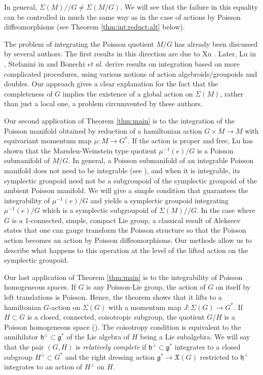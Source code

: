 \documentclass[a4paper,11pt]{amsart}
\theoremstyle{definition}
\theoremstyle{remark}
\begin{document}
In general, $\Sigma(M)//G\not=\Sigma(M/G)$. We will see that the failure
in this equality can be controlled in much the same way as in the
case of actions by Poisson diffeomorphisms \cite{FerOrRa} (see
Theorem \ref{thm:int:reduct:alt} below).

The problem of integrating the Poisson quotient $M/G$ has already been discussed by several authors. The first
results in this direction are due to Xu \cite{Xu1}. Later, Lu in \cite{Lu3}, Stefanini in \cite{Ste} and Bonechi
\textit{et al.} \cite{BCST} derive results on integration based on more complicated procedures, using various
notions of action algebroids/groupoids and doubles. Our approach gives a clear explanation for the fact that the
completeness of $G$ implies the existence of a global action on $\Sigma(M)$, rather than just a local one, a
problem circumvented by these authors.

Our second application of Theorem \ref{thm:main} is to the integration of the Poisson manifold obtained by
reduction of a hamiltonian action $G\times M\to M$ with equivariant momentum map $\mu:M\to G^*$. If the action
is proper and free, Lu \cite{Lu1} has shown that the Marsden-Weinstein type quotient $\mu^{-1}(e)/G$ is a
Poisson submanifold of $M/G$. In general, a Poisson submanifold of an integrable Poisson manifold does not need
to be integrable (see \cite{CrFe2}), and when it is integrable, its symplectic groupoid need not be a
subgroupoid of the symplectic groupoid of the ambient Poisson manifold. We will give a simple condition that
guarantees the integrability of $\mu^{-1}(e)/G$ and yields a symplectic groupoid integrating $\mu^{-1}(e)/G$
which is a symplectic subgroupoid of $\Sigma(M)//G$. In the case where $G$ is a 1-connected, simple, compact Lie
group, a classical result of Alekseev \cite{Alek} states that one can gauge transform the Poisson structure so
that the Poisson action becomes an action by Poisson diffeomorphisms. Our methods allow us to describe what
happens to this operation at the level of the lifted action on the symplectic groupoid.

Our last application of Theorem \ref{thm:main} is to the
integrability of Poisson homogeneous spaces. If $G$ is any Poisson-Lie group,
the action of $G$ on itself by left translations is Poisson. Hence, the
theorem shows that it lifts to a hamiltonian $G$-action on $\Sigma(G)$ with
a momentum map $J:\Sigma(G)\to G^*$. If $H\subset G$ is a closed, connected, coisotropic subgroup,
the quotient $G/H$ is a Poisson homogeneous space (\cite{Lu2}). The coisotropy condition is equivalent
to the annihilator ${\mathfrak{h}}^\perp\subset{\mathfrak{g}}^*$ of the Lie algebra of $H$ being a Lie subalgebra. We will say
that the pair $(G,H)$ is \emph{relatively complete} if ${\mathfrak{h}}^\perp\subset{\mathfrak{g}}^*$ integrates to a closed subgroup
$H^\perp\subset G^*$ and the right dressing action ${\mathfrak{g}}^*\to{\ensuremath{\mathfrak{X}}}(G)$ restricted to ${\mathfrak{h}}^\perp$ integrates to an
action of $H^\perp$ on $H$.
\end{document}
